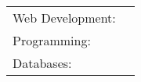 \documentclass[]{awesome-cv}
\begin{document}
\begin{cventries}
	\cventry
	{}
	{\def\arraystretch{1.15}{\begin{tabular}{ l l }
		Web Development:  & {\skill{ HTML, CSS, JavaScript, Ruby on Rails, GraphQL, React}} \\
		Programming:  & {\skill{ Lua, Python, D, C/C++, C\#, Go}} \\
		Databases:  & {\skill{ SQL, PostgreSQL, MySQL, Redis}} \\
		\end{tabular}}}
	{}
	{}
	{}
\end{cventries}

\vspace{-7mm}


\ 
\end{document}
